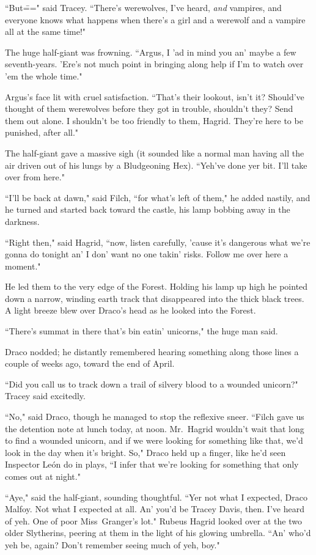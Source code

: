 ``But\===" said Tracey. ``There's werewolves, I've heard, \emph{and} vampires, and everyone knows what happens when there's a girl and a werewolf and a vampire all at the same time!"

The huge half-giant was frowning. ``Argus, I 'ad in mind you an' maybe a few seventh-years. 'Ere's not much point in bringing along help if I'm to watch over 'em the whole time."

Argus's face lit with cruel satisfaction. ``That's their lookout, isn't it? Should've thought of them werewolves before they got in trouble, shouldn't they? Send them out alone. I shouldn't be too friendly to them, Hagrid. They're here to be punished, after all."

The half-giant gave a massive sigh (it sounded like a normal man having all the air driven out of his lungs by a Bludgeoning Hex). ``Yeh've done yer bit. I'll take over from here."

``I'll be back at dawn," said Filch, ``for what's left of them," he added nastily, and he turned and started back toward the castle, his lamp bobbing away in the darkness.

``Right then," said Hagrid, ``now, listen carefully, 'cause it's dangerous what we're gonna do tonight an' I don' want no one takin' risks. Follow me over here a moment."

He led them to the very edge of the Forest. Holding his lamp up high he pointed down a narrow, winding earth track that disappeared into the thick black trees. A light breeze blew over Draco's head as he looked into the Forest.

``There's summat in there that's bin eatin' unicorns," the huge man said.

Draco nodded; he distantly remembered hearing something along those lines a couple of weeks ago, toward the end of April.

``Did you call us to track down a trail of silvery blood to a wounded unicorn?" Tracey said excitedly.

``No," said Draco, though he managed to stop the reflexive sneer. ``Filch gave us the detention note at lunch today, at noon. Mr.~Hagrid wouldn't wait that long to find a wounded unicorn, and if we were looking for something like that, we'd look in the day when it's bright. So," Draco held up a finger, like he'd seen Inspector León do in plays, ``I infer that we're looking for something that only comes out at night."

``Aye," said the half-giant, sounding thoughtful. ``Yer not what I expected, Draco Malfoy. Not what I expected at all. An' you'd be Tracey Davis, then. I've heard of yeh. One of poor Miss~Granger's lot." Rubeus Hagrid looked over at the two older Slytherins, peering at them in the light of his glowing umbrella. ``An' who'd yeh be, again? Don't remember seeing much of yeh, boy."

